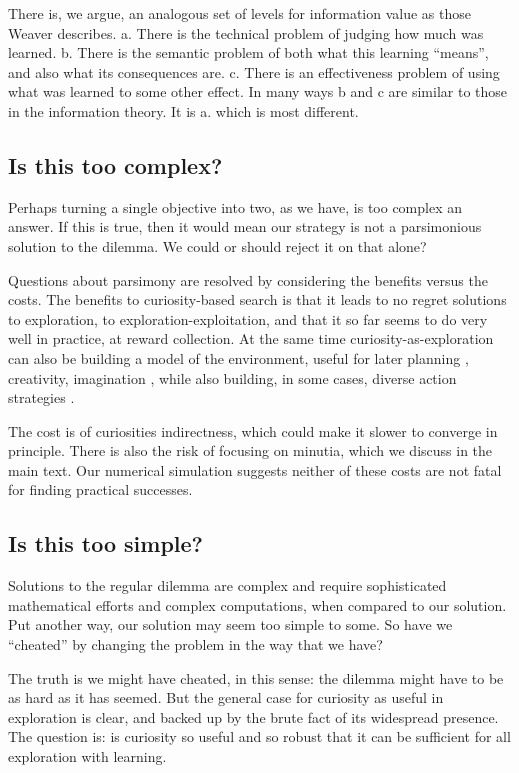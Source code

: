 There is, we argue, an analogous set of levels for information value as those Weaver describes. a. There is the technical problem of judging how much was learned. b. There is the semantic problem of both what this learning ``means'', and also what its consequences are. c. There is an effectiveness problem of using what was learned to some other effect. In many ways b and c are similar to those in the information theory. It is a. which is most different. 


\subsection*{Is this too complex?}
Perhaps turning a single objective into two, as we have, is too complex an answer. If this is true, then it would mean our strategy is not a parsimonious solution to the dilemma. We could or should reject it on that alone?

Questions about parsimony are resolved by considering the benefits versus the costs. The benefits to curiosity-based search is that it leads to no regret solutions to exploration, to exploration-exploitation, and that it so far seems to do very well in practice, at reward collection. At the same time curiosity-as-exploration can also be building a model of the environment, useful for later planning \citep{Ahilan2019,Poucet1993}, creativity, imagination \citep{Schmidhuber2010}, while also building, in some cases, diverse action strategies \citep{Lehman2011a,Lehman2013,Mouret2015,Colas2020}. 

The cost is of curiosities indirectness, which could make it slower to converge in principle. There is also the risk of focusing on minutia, which we discuss in the main text. Our numerical simulation suggests neither of these costs are not fatal for finding practical successes.


\subsection*{Is this too simple?}
Solutions to the regular dilemma are complex and require sophisticated mathematical efforts and complex computations, when compared to our solution. Put another way, our solution may seem too simple to some. So have we ``cheated'' by changing the problem in the way that we have?

The truth is we might have cheated, in this sense: the dilemma might have to be as hard as it has seemed. But the general case for curiosity as useful in exploration is clear, and backed up by the brute fact of its widespread presence. The question is: is curiosity so useful and so robust that it can be sufficient for all exploration with learning. 

